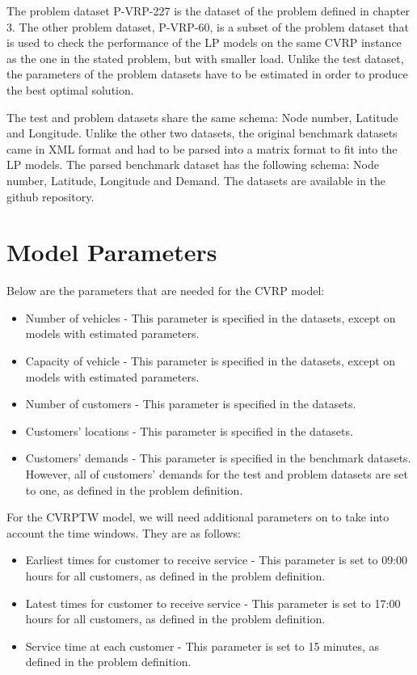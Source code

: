 The problem dataset P-VRP-227 is the dataset of the problem defined in chapter 3. The other problem dataset, P-VRP-60, is a subset of the problem dataset
that is used to check the performance of the LP models on the same CVRP instance as the one in the stated problem, but with smaller load.
Unlike the test dataset, the parameters of the problem datasets have to be estimated in order to produce the best optimal solution.

The test and problem datasets
share the same schema: Node number, Latitude and Longitude. Unlike the other two datasets, the original benchmark datasets came in
XML format and had to be parsed into a matrix format to fit into the LP models. The parsed benchmark dataset has the following schema:
Node number, Latitude, Longitude and Demand. The datasets are available in the github repository.

\section{Model Parameters}
Below are the parameters that are needed for the CVRP model:
\begin{itemize}
\item Number of vehicles - This parameter is specified in the datasets, except on models with estimated parameters.
\item Capacity of vehicle - This parameter is specified in the datasets, except on models with estimated parameters.
\item Number of customers - This parameter is specified in the datasets.
\item Customers' locations - This parameter is specified in the datasets.
\item Customers' demands - This parameter is specified in the benchmark datasets. However, all of customers' demands
for the test and problem datasets are set to one, as defined in the problem definition.
\end{itemize}

For the CVRPTW model, we will need additional parameters on to take into account the time windows. They are as follows:
\begin{itemize}
\item Earliest times for customer to receive service - This parameter is set to 09:00 hours for all customers, as defined in the problem definition.
\item Latest times for customer to receive service - This parameter is set to 17:00 hours for all customers, as defined in the problem definition.
\item Service time at each customer - This parameter is set to 15 minutes, as defined in the problem definition.
\end{itemize}


